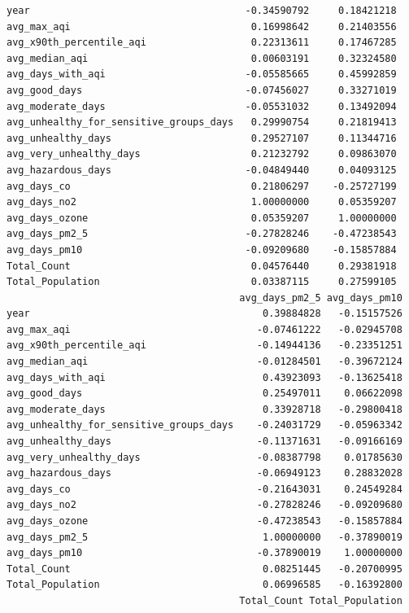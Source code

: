 \documentclass[
  12pt,
]{article}
\begin{document}
\begin{verbatim}
year                                     -0.34590792     0.18421218
avg_max_aqi                               0.16998642     0.21403556
avg_x90th_percentile_aqi                  0.22313611     0.17467285
avg_median_aqi                            0.00603191     0.32324580
avg_days_with_aqi                        -0.05585665     0.45992859
avg_good_days                            -0.07456027     0.33271019
avg_moderate_days                        -0.05531032     0.13492094
avg_unhealthy_for_sensitive_groups_days   0.29990754     0.21819413
avg_unhealthy_days                        0.29527107     0.11344716
avg_very_unhealthy_days                   0.21232792     0.09863070
avg_hazardous_days                       -0.04849440     0.04093125
avg_days_co                               0.21806297    -0.25727199
avg_days_no2                              1.00000000     0.05359207
avg_days_ozone                            0.05359207     1.00000000
avg_days_pm2_5                           -0.27828246    -0.47238543
avg_days_pm10                            -0.09209680    -0.15857884
Total_Count                               0.04576440     0.29381918
Total_Population                          0.03387115     0.27599105
                                        avg_days_pm2_5 avg_days_pm10
year                                        0.39884828   -0.15157526
avg_max_aqi                                -0.07461222   -0.02945708
avg_x90th_percentile_aqi                   -0.14944136   -0.23351251
avg_median_aqi                             -0.01284501   -0.39672124
avg_days_with_aqi                           0.43923093   -0.13625418
avg_good_days                               0.25497011    0.06622098
avg_moderate_days                           0.33928718   -0.29800418
avg_unhealthy_for_sensitive_groups_days    -0.24031729   -0.05963342
avg_unhealthy_days                         -0.11371631   -0.09166169
avg_very_unhealthy_days                    -0.08387798    0.01785630
avg_hazardous_days                         -0.06949123    0.28832028
avg_days_co                                -0.21643031    0.24549284
avg_days_no2                               -0.27828246   -0.09209680
avg_days_ozone                             -0.47238543   -0.15857884
avg_days_pm2_5                              1.00000000   -0.37890019
avg_days_pm10                              -0.37890019    1.00000000
Total_Count                                 0.08251445   -0.20700995
Total_Population                            0.06996585   -0.16392800
                                        Total_Count Total_Population

\end{verbatim}
\end{document}
